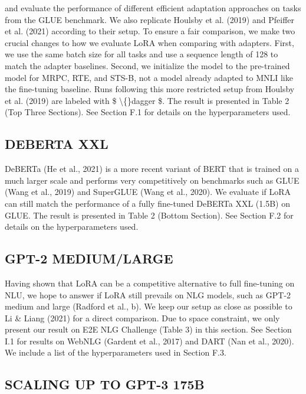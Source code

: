 \documentclass[conference]{IEEEtran}
\begin{document}
and evaluate the performance of different efficient adaptation approaches on tasks from the GLUE benchmark. We also replicate Houlsby et al. (2019) and Pfeiffer et al. (2021) according to their setup. To ensure a fair comparison, we make two crucial changes to how we evaluate LoRA when comparing with adapters. First, we use the same batch size for all tasks and use a sequence length of 128 to match the adapter baselines. Second, we initialize the model to the pre-trained model for MRPC, RTE, and STS-B, not a model already adapted to MNLI like the fine-tuning baseline. Runs following this more restricted setup from Houlsby et al. (2019) are labeled with  \$ \textbackslash\{\}dagger \$. The result is presented in Table 2 (Top Three Sections). See Section F.1 for details on the hyperparameters used.




\subsection{DEBERTA XXL}

DeBERTa (He et al., 2021) is a more recent variant of BERT that is trained on a much larger scale and performs very competitively on benchmarks such as GLUE (Wang et al., 2019) and SuperGLUE (Wang et al., 2020). We evaluate if LoRA can still match the performance of a fully fine-tuned DeBERTa XXL (1.5B) on GLUE. The result is presented in Table 2 (Bottom Section). See Section F.2 for details on the hyperparameters used.




\subsection{GPT-2 MEDIUM/LARGE}

Having shown that LoRA can be a competitive alternative to full fine-tuning on NLU, we hope to answer if LoRA still prevails on NLG models, such as GPT-2 medium and large (Radford et al., b). We keep our setup as close as possible to Li \& Liang (2021) for a direct comparison. Due to space constraint, we only present our result on E2E NLG Challenge (Table 3) in this section. See Section I.1 for results on WebNLG (Gardent et al., 2017) and DART (Nan et al., 2020). We include a list of the hyperparameters used in Section F.3.




\subsection{SCALING UP TO GPT-3 175B}
\end{document}
